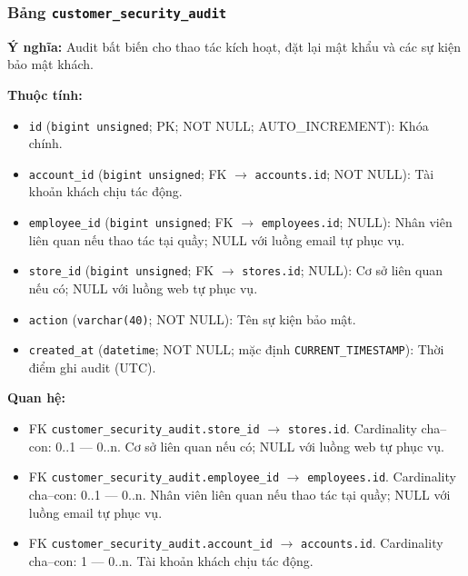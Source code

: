 \subsubsection{Bảng \texttt{customer\_security\_audit}}

\textbf{Ý nghĩa:} Audit bất biến cho thao tác kích hoạt, đặt lại mật khẩu và các sự kiện bảo mật khách.\par

\textbf{Thuộc tính:}

\begin{itemize}

\item \texttt{id} (\texttt{bigint unsigned}; PK; NOT NULL; AUTO_INCREMENT): Khóa chính.

\item \texttt{account\_id} (\texttt{bigint unsigned}; FK $\rightarrow$ \texttt{accounts.id}; NOT NULL): Tài khoản khách chịu tác động.

\item \texttt{employee\_id} (\texttt{bigint unsigned}; FK $\rightarrow$ \texttt{employees.id}; NULL): Nhân viên liên quan nếu thao tác tại quầy; NULL với luồng email tự phục vụ.

\item \texttt{store\_id} (\texttt{bigint unsigned}; FK $\rightarrow$ \texttt{stores.id}; NULL): Cơ sở liên quan nếu có; NULL với luồng web tự phục vụ.

\item \texttt{action} (\texttt{varchar(40)}; NOT NULL): Tên sự kiện bảo mật.

\item \texttt{created\_at} (\texttt{datetime}; NOT NULL; mặc định \texttt{CURRENT\_TIMESTAMP}): Thời điểm ghi audit (UTC).

\end{itemize}

\textbf{Quan hệ:}

\begin{itemize}

\item FK \texttt{customer\_security\_audit.store\_id} $\rightarrow$ \texttt{stores.id}. Cardinality cha--con: 0..1 — 0..n. Cơ sở liên quan nếu có; NULL với luồng web tự phục vụ.

\item FK \texttt{customer\_security\_audit.employee\_id} $\rightarrow$ \texttt{employees.id}. Cardinality cha--con: 0..1 — 0..n. Nhân viên liên quan nếu thao tác tại quầy; NULL với luồng email tự phục vụ.

\item FK \texttt{customer\_security\_audit.account\_id} $\rightarrow$ \texttt{accounts.id}. Cardinality cha--con: 1 — 0..n. Tài khoản khách chịu tác động.

\end{itemize}

